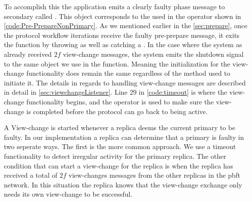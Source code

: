 To accomplish this the application emits a clearly faulty phase message to secondary  called . This  object corresponds to the  used in the  operator shown in \autoref{code:Pre-PrepareNonPrimary}. As we mentioned earlier in the \autoref{sec:prepare}, once the protocol workflow iterations receive the faulty pre-prepare message, it exits the function by throwing as well as catching a . In the case where the system as already received $2f$ view-change messages, the system emits the shutdown signal to the same   object we use in the   function. Meaning the initialization for the view-change functionality does remain the same regardless of the method used to initiate it. The details in regards to handling view-change messages are described in detail in  \autoref{sec:viewchangeListener}. Line 29 in \autoref{code:timeout} is where the view-change functionality begins, and the  operator is used to make sure the view-change is completed before the protocol can go back to being active. 

\iffalse
A View-change is started whenever a replica deems the current primary to be faulty. In our implementation a replica can determine that a primary is faulty in two seperate ways. The first is the more common approach. We use a timeout functionality to detect irregular activity for the primary replica. The other condition that can start a view-change for the replica is when the replica has received a total of $2f$ view-changes messages from the other replicas in the \ac{pbft} network. In this situation the replica knows that the view-change exchange only needs its own view-change to be successful. 


